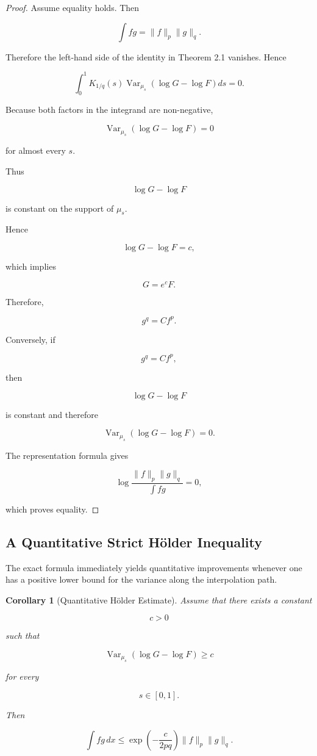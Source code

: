 \documentclass[11pt]{amsart}
\newtheorem{corollary}[theorem]{Corollary}
\begin{document}
\begin{proof}

Assume equality holds. Then

\[
\int fg
=
\|f\|_p\|g\|_q .
\]

Therefore the left-hand side of the identity in Theorem 2.1
vanishes. Hence

\[
\int_0^1
K_{1/q}(s)
\operatorname{Var}_{\mu_s}
(
\log G-\log F
)
ds
=
0 .
\]

Because both factors in the integrand are non-negative,

\[
\operatorname{Var}_{\mu_s}
(
\log G-\log F
)
=
0
\]

for almost every $s$.

Thus

\[
\log G-\log F
\]

is constant on the support of $\mu_s$.

Hence

\[
\log G-\log F
=
c,
\]

which implies

\[
G=e^cF .
\]

Therefore,

\[
g^q=Cf^p .
\]

Conversely, if

\[
g^q=Cf^p,
\]

then

\[
\log G-\log F
\]

is constant and therefore

\[
\operatorname{Var}_{\mu_s}
(
\log G-\log F
)
=0 .
\]

The representation formula gives

\[
\log
\frac{
\|f\|_p\|g\|_q
}{
\int fg
}
=0 ,
\]

which proves equality.

\end{proof}



\subsection{A Quantitative Strict Hölder Inequality}


The exact formula immediately yields quantitative improvements whenever
one has a positive lower bound for the variance along the
interpolation path.


\begin{corollary}[Quantitative Hölder Estimate]
Assume that there exists a constant

\[
c>0
\]

such that

\[
\operatorname{Var}_{\mu_s}
(
\log G-\log F
)
\geq c
\]

for every

\[
s\in[0,1].
\]

Then

\[
\boxed{
\int fg\,dx
\leq
\exp
\left(
-\frac{c}{2pq}
\right)
\|f\|_p
\|g\|_q .
}
\]

\end{corollary}
\end{document}
